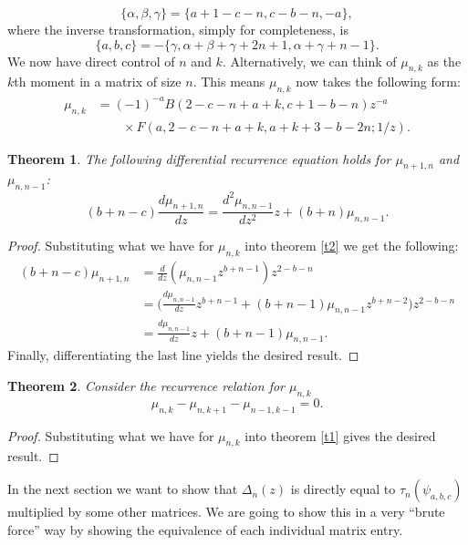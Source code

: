 \documentclass[12pt]{article}
\newtheorem{mydef}{Theorem}[section]
\numberwithin{figure}{section}
\numberwithin{equation}{section}
\numberwithin{table}{section}
\begin{document}
$$\{\alpha,\beta,\gamma\}=\big\{a+1-c-n,c-b-n,-a\big\},$$
where the inverse transformation, simply for completeness, is
$$\{a,b,c\}=-\big\{\gamma,\alpha+\beta+\gamma+2n+1,\alpha+\gamma+n-1\big\}.$$
We now have direct control of $n$ and $k$. Alternatively, we can think of $\mu_{n,k}$ as the $k$th moment in a matrix of size $n$.
This means $\mu_{n,k}$ now takes the following form:
\begin{align}
\mu_{n,k}&=(-1)^{-a}B(2-c-n+a+k,c+1-b-n)z^{-a}\\&\qquad \times F(a,2-c-n+a+k,a+k+3-b-2n;1/z).
\end{align}
\begin{mydef}
The following differential recurrence equation holds for $\mu_{n+1,n}$ and $\mu_{n,n-1}$:
\begin{equation}
(b+n-c)\frac{d\mu_{n+1,n}}{dz}=\frac{d^2\mu_{n,n-1}}{dz^2}z+(b+n)\mu_{n,n-1}. \label{t3}
\end{equation}
\end{mydef}
\begin{proof}
Substituting what we have for $\mu_{n,k}$ into theorem \ref{t2} we get the following:
\begin{align*}
(b+n-c)\mu_{n+1,n}&=\frac{d}{dz}(\mu_{n,n-1}z^{b+n-1})z^{2-b-n}\\
&=\bigg(\frac{d\mu_{n,n-1}}{dz}z^{b+n-1}+(b+n-1)\mu_{n,n-1}z^{b+n-2}\bigg)z^{2-b-n}\\
&=\frac{d\mu_{n,n-1}}{dz}z+(b+n-1)\mu_{n,n-1}.
\end{align*}
Finally, differentiating the last line yields the desired result.
\end{proof}
\begin{mydef}
Consider the recurrence relation for $\mu_{n,k}$
\begin{equation}
\mu_{n,k}-\mu_{n,k+1}-\mu_{n-1,k-1}=0. \label{rec}
\end{equation}
\end{mydef}
\begin{proof}
Substituting what we have for $\mu_{n,k}$ into theorem \ref{t1} gives the desired result.
\end{proof}
In the next section we want to show that $\Delta_n(z)$ is directly equal to $\tau_n(\psi_{a,b,c})$ multiplied by some other matrices. We are going to show this in a very ``brute force'' way by showing the equivalence of each individual matrix entry.
\end{document}
